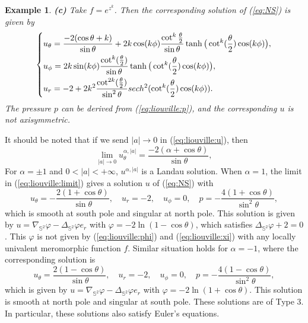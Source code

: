 \documentclass[12pt]{article}
\newtheorem{example}{Example}[section]
\newcommand{\bS}{\mathbb{S}}
\begin{document}
\begin{example}
	\noindent\textbf{\em (c)} Take $f = e^{z^k}$. Then the corresponding solution of (\ref{eq:NS}) is given by
	\begin{equation}
	\left\{
	\begin{aligned}
		& u_\theta = \frac{-2(\cos\theta+k)}{\sin\theta} + 2k \cos(k\phi) \frac{\cot^k\frac{\theta}{2}}{\sin\theta} \tanh \big( \cot^k(\frac{\theta}{2}) \cos(k\phi) \big), \\
		& u_\phi = 2k \sin(k\phi) \frac{\cot^k(\frac{\theta}{2})}{\sin\theta} \tanh \big( \cot^k(\frac{\theta}{2}) \cos(k\phi) \big), \\
		& u_r = -2 + 2k^2 \frac{\cot^{2k}(\frac{\theta}{2})}{\sin^2\theta} \emph{sech}^2 ( \cot^k(\frac{\theta}{2}) \cos (k\phi) ). 
	\end{aligned}
	\right.
	\end{equation}
	The pressure $p$ can be derived from (\ref{eq:liouville:p}), and the corresponding $u$ is not axisymmetric. 	
\end{example}

\vspace{0.5cm}

It should be noted that if we send $|a|\to 0$ in (\ref{eq:liouville:u}), then 
\begin{equation}\label{eq:liouville:limit}
	\lim_{|a|\to 0}u_{\theta}^{\alpha,|a|}= \frac{-2(\alpha + \cos\theta)}{\sin\theta}, 
\end{equation}
For $\alpha=\pm 1$ and $0<|a|<+\infty$, $u^{\alpha, |a|}$ is a Landau solution. When $\alpha=1$, the limit in (\ref{eq:liouville:limit}) gives a solution $u$ of (\ref{eq:NS}) with 
\[
	u_{\theta}=-\frac{ 2(1+\cos\theta)}{\sin\theta},\quad u_r=-2, \quad u_{\phi}=0, \quad p=-\frac{4(1+\cos\theta)}{\sin^2\theta}, 
\]
which is smooth at south pole and singular at north pole. This solution is given by $u=\nabla_{\bS^2} \varphi-\Delta_{\bS^2} \varphi e_r$ with $\varphi=-2\ln (1-\cos \theta)$, which satisfies $\Delta_{\bS^2}\varphi+2=0$. This $\varphi$ is not given by (\ref{eq:liouville:phi}) and (\ref{eq:liouville:xi}) with any locally univalent meromorphic function $f$. Similar situation holds for $\alpha=-1$, where the corresponding solution is
\[
	u_{\theta}=\frac{2(1-\cos\theta)}{\sin\theta}, \quad u_r=-2, \quad u_{\phi}=0, \quad p=-\frac{4(1-\cos\theta)}{\sin^2\theta},
\]
which is given by $u=\nabla_{\bS^2} \varphi-\Delta_{\bS^2} \varphi e_r$ with $\varphi=-2\ln (1+\cos\theta)$. This solution is smooth at north pole and singular at south pole. These solutions are of Type 3. In particular, these solutions also satisfy Euler's equations. 
\end{document}
